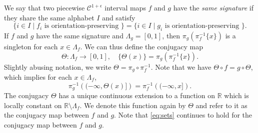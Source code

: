 \documentclass[11pt]{amsart}
\newcommand{\1}{1}
\newcommand{\N}{\mathbb{N}}
\newcommand{\R}{\mathbb{R}}
\begin{document}
We say that two piecewise $\mathcal{C}^{1+\epsilon}$ interval maps $f$ and $g$ have the {\em same signature} if they share the same alphabet $I$ and satisfy 
$$\{i\in I\mid f_i \text{ is orientation-preserving }\}=\{i\in I\mid g_i \text{ is orientation-preserving }\}.$$ 
If $f$ and $g$ have the same signature and $\Lambda_g=[0,1]$, then 
$\pi_g(\pi_f^{-1}\{x\})$ is  a singleton for each $x\in \Lambda_f$. We can thus define the conjugacy 
map 
\[\Theta:\Lambda_f\rightarrow[0,1], \quad \{\Theta(x)\}=\pi_g(\pi_f^{-1}\{x\}).
\] 
Slightly abusing notation, we write $\Theta=\pi_g\circ\pi_f^{-1}$. Note that we have 
 $\Theta\circ f=g\circ\Theta$, which implies for each $x\in\Lambda_f$,  
 \begin{equation}
\pi_{g}^{-1}\left((-\infty,\Theta(x)]\right)=\pi_{f}^{-1}\left((-\infty,x]\right).\label{eq:sets}
\end{equation}
The conjugacy $\Theta$ has a unique continuous extension to a function on $\R$ which is locally constant on $\R \setminus \Lambda_f$.  We denote this function again by $\Theta$ and refer to it as the conjugacy map between $f$ and $g$. Note that \eqref{eq:sets} continues to hold for the conjugacy map between $f$ and $g$.  
\end{document}
